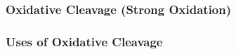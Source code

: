 	\subsubsection{Oxidative Cleavage (Strong Oxidation)}

	\subsubsection{Uses of Oxidative Cleavage}

































